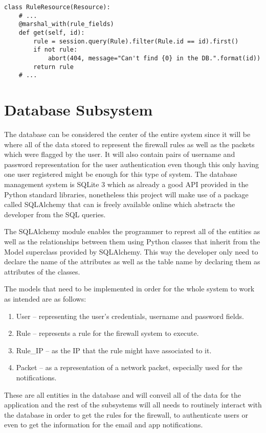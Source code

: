 \begin{lstlisting}[caption=Example of the use of marshal\_with decorator.]
class RuleResource(Resource):
	# ...
	@marshal_with(rule_fields)
	def get(self, id):
		rule = session.query(Rule).filter(Rule.id == id).first()
		if not rule:
			abort(404, message="Can't find {0} in the DB.".format(id))
		return rule
	# ...
\end{lstlisting}

\section{Database Subsystem}
\label{chap4:sec:db-sys}
The database can be considered the center of the entire system since it will be
where all of the data stored to represent the firewall rules as well as the
packets which were flagged by the user. It will also contain pairs of username
and password representation for the user authentication even though this only
having one user registered might be enough for this type of system.
The database management system is SQLite 3 which as already a good API provided
in the Python standard libraries, nonetheless this project will make use of a
package called SQLAlchemy that can is freely available online which abstracts
the developer from the SQL queries.

The SQLAlchemy module enables the programmer to represt all of the entities as
well as the relationships between them using Python classes that inherit from
the Model superclass provided by SQLAlchemy. This way the developer only need to
declare the name of the attributes as well as the table name by declaring them
as attributes of the classes.

The models that need to be implemented in order for the whole system to work as
intended are as follows:
\begin{enumerate}
	\item User -- representing the user's credentials, username and password
		fields.
	\item Rule -- represents a rule for the firewall system to execute.
	\item Rule\_IP -- as the IP that the rule might have associated to it.
	\item Packet -- as a representation of a network packet, especially used for
		the notifications.
\end{enumerate}

These are all entities in the database and will conveil all of the data for the
application and the rest of the subsystems will all needs to routinely interact
with the database in order to get the rules for the firewall, to authenticate
users or even to get the information for the email and app notifications.

